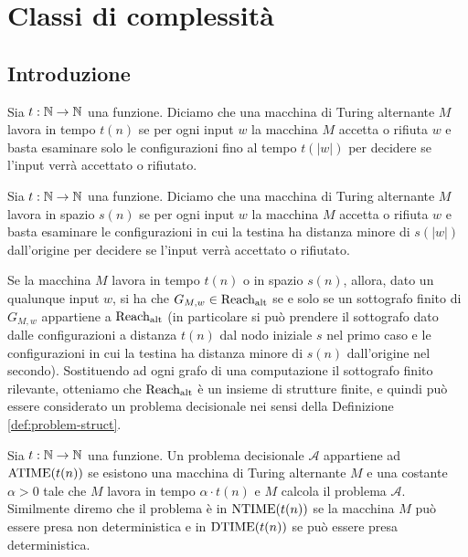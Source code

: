 \chapter{Classi di complessità}

\section{Introduzione}

\begin{definizione}
 Sia $t:\mathbb{N}\to\mathbb{N}$ una funzione. Diciamo che una macchina di Turing alternante
 $M$ lavora in tempo $t(n)$ se per ogni input $w$ la macchina $M$ accetta o
 rifiuta $w$ e basta esaminare solo le configurazioni fino al tempo $t(|w|)$
 per decidere se l'input verrà accettato o rifiutato.
\end{definizione}

\begin{definizione}
 Sia $t:\mathbb{N}\to\mathbb{N}$ una funzione. Diciamo che una macchina di Turing alternante
 $M$ lavora in spazio $s(n)$ se per ogni input $w$
 la macchina $M$ accetta o
 rifiuta $w$ e basta esaminare le configurazioni in cui la testina
 ha distanza minore di $s(|w|)$ dall'origine
 per decidere se l'input verrà accettato o rifiutato.
\end{definizione}

\begin{osservazione}
 Se la macchina $M$ lavora in tempo $t(n)$ o in spazio $s(n)$, allora,
 dato un qualunque input $w$, si ha che $G_{M,w} \in \operatorname{Reach_{alt}}$ se e solo se
 un sottografo finito di $G_{M,w}$ appartiene a $\operatorname{Reach_{alt}}$ (in particolare si può
 prendere il sottografo dato dalle configurazioni a distanza $t(n)$ dal nodo
 iniziale $s$ nel primo caso e le configurazioni in cui la testina ha distanza minore
 di $s(n)$ dall'origine nel secondo). Sostituendo ad ogni grafo di una computazione
 il sottografo finito rilevante, otteniamo che $\operatorname{Reach_{alt}}$ è un insieme di strutture
 finite, e quindi può essere considerato un problema decisionale nei sensi della
 Definizione \ref{def:problem-struct}.
\end{osservazione}


\begin{definizione}
 Sia $t:\mathbb{N}\to\mathbb{N}$ una funzione.
 Un problema decisionale $\mathcal{A}$ appartiene ad $\operatorname{ATIME}(t(n))$ se esistono una macchina
 di Turing alternante $M$ e una costante $\alpha>0$ tale che $M$ lavora in tempo
 $\alpha \cdot t(n)$ e $M$ calcola il problema $\mathcal{A}$. Similmente diremo che
 il problema è in $\operatorname{NTIME}(t(n))$ se la macchina $M$ può essere presa non
 deterministica e in $\operatorname{DTIME}(t(n))$ se può essere presa deterministica.
\end{definizione}

